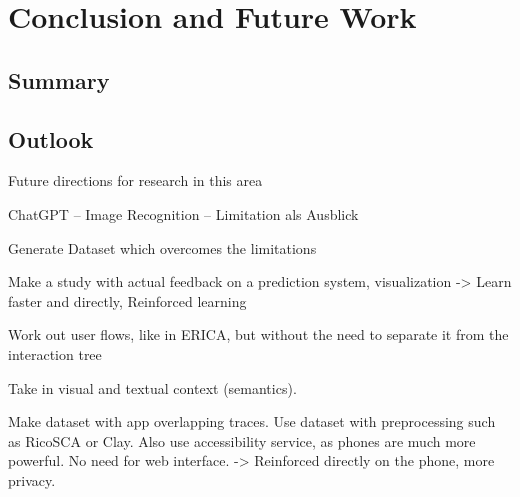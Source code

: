\chapter{Conclusion and Future Work}
\label{sec:zusfas}

\section*{Summary}
\section*{Outlook}

Future directions for research in this area

ChatGPT – Image Recognition – Limitation als Ausblick

Generate Dataset which overcomes the limitations

Make a study with actual feedback on a prediction system, visualization
-> Learn faster and directly, Reinforced learning

Work out user flows, like in ERICA, but without the need to separate it from the interaction tree

Take in visual and textual context (semantics).

Make dataset with app overlapping traces.
Use dataset with preprocessing such as RicoSCA or Clay.
Also use accessibility service, as phones are much more powerful.
No need for web interface.
-> Reinforced directly on the phone, more privacy.

